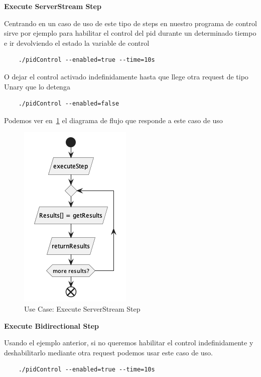 \textbf{Execute ServerStream Step}

Centrando en un caso de uso de este tipo de steps en nuestro programa de control sirve por ejemplo para habilitar el control del pid durante un determinado tiempo e ir devolviendo el estado la variable de control
\begin{verbatim}
    ./pidControl --enabled=true --time=10s
\end{verbatim}

O dejar el control activado indefinidamente hasta que llege otra request de tipo Unary que lo detenga

\begin{verbatim}
    ./pidControl --enabled=false
\end{verbatim}

Podemos ver en~\ref{fig:Use Case-Execute ServerStream Step} el diagrama de flujo que responde a este caso de uso

\begin{figure}[H]
    \centering
    \includegraphics[height=0.2\textheight]{./part/Proyecto_ejecutivo/memoria_descriptiva/descripcionDelProyecto/client/uml/executeServerStreamStep}
    \caption{Use Case: Execute ServerStream Step}\label{fig:Use Case-Execute ServerStream Step}
\end{figure}

\textbf{Execute Bidirectional Step}

Usando el ejemplo anterior, si no queremos habilitar el control indefinidamente y deshabilitarlo mediante otra request podemos usar este caso de uso.

\begin{verbatim}
    ./pidControl --enabled=true --time=10s
\end{verbatim}

